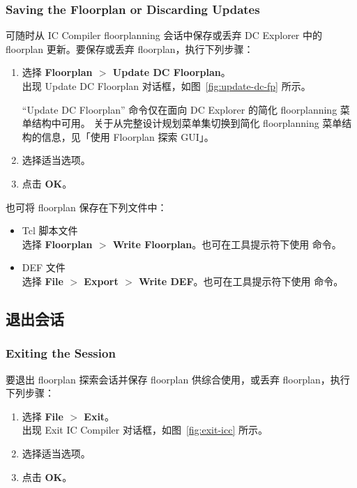 \subsubsection*{Saving the Floorplan or Discarding Updates}

可随时从 IC Compiler floorplanning 会话中保存或丢弃 DC Explorer 中的 floorplan 更新。要保存或丢弃 floorplan，执行下列步骤：
\begin{enumerate}
  \item 选择 \textbf{Floorplan $>$ Update DC Floorplan}。\\
        出现 Update DC Floorplan 对话框，如图~\ref{fig:update-dc-fp} 所示。
\begin{noteBox}
``Update DC Floorplan'' 命令仅在面向 DC Explorer 的简化 floorplanning 菜单结构中可用。
关于从完整设计规划菜单集切换到简化 floorplanning 菜单结构的信息，见「使用 Floorplan 探索 GUI」。
\end{noteBox}
  \item 选择适当选项。
  \item 点击 \textbf{OK}。
\end{enumerate}


也可将 floorplan 保存在下列文件中：
\begin{itemize}
  \item Tcl 脚本文件\\
        选择 \textbf{Floorplan $>$ Write Floorplan}。也可在工具提示符下使用  命令。
  \item DEF 文件\\
        选择 \textbf{File $>$ Export $>$ Write DEF}。也可在工具提示符下使用  命令。
\end{itemize}

\subsection{退出会话}
\subsubsection*{Exiting the Session}

要退出 floorplan 探索会话并保存 floorplan 供综合使用，或丢弃 floorplan，执行下列步骤：
\begin{enumerate}
  \item 选择 \textbf{File $>$ Exit}。\\
        出现 Exit IC Compiler 对话框，如图~\ref{fig:exit-icc} 所示。
  \item 选择适当选项。
  \item 点击 \textbf{OK}。
\end{enumerate}

